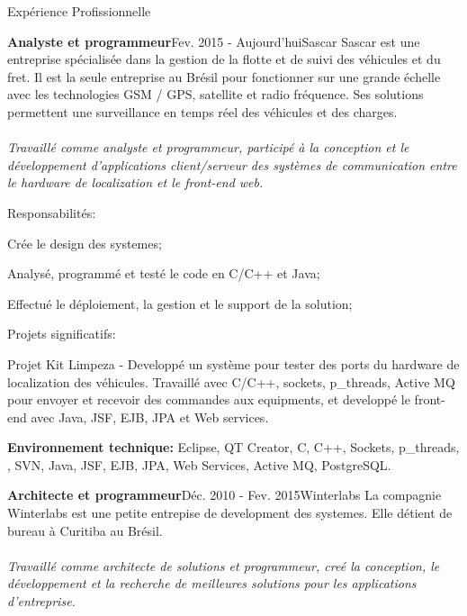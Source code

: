 \documentclass{resume}
\begin{document}
  \begin{rSection}{Expérience Profissionnelle}

    \begin{rSubsection}{\fontsize{12}{14}\selectfont \bf Analyste et programmeur}{\fontsize{12}{14}\selectfont Fev. 2015 - Aujourd'hui}{\fontsize{12}{14}\selectfont Sascar}{}
    Sascar est une entreprise spécialisée dans la gestion de la flotte et de suivi des véhicules et du fret. Il est la seule entreprise au Brésil pour fonctionner sur une grande échelle avec les technologies GSM / GPS, satellite et radio fréquence. Ses solutions permettent une surveillance en temps réel des véhicules et des charges.\\\\
    \textit{Travaillé comme analyste et programmeur, participé à la conception et le développement d’applications client/serveur des systèmes de communication entre le hardware de localization et le front-end web.}

    \end{rSubsection}

      \begin{rSubsection}{\fontsize{9}{10}\selectfont Responsabilités:}{}{}{}
        \item Crée le design des systemes;
        \item Analysé, programmé et testé le code en C/C++ et Java;
        \item Effectué le déploiement, la gestion et le support de la solution;
      \end{rSubsection}

      \begin{rSubsection}{\fontsize{9}{10}\selectfont Projets significatifs:}{}{}{}
        \item Projet Kit Limpeza - Developpé un système pour tester des ports du hardware de localization des véhicules. Travaillé avec C/C++, sockets, p\_threads, Active MQ pour envoyer et recevoir des commandes aux equipments, et developpé le front-end avec Java, JSF, EJB, JPA et Web services.
      \end{rSubsection}

      {\fontsize{8}{9}\selectfont \textbf{Environnement technique:} Eclipse, QT Creator, C, C++, Sockets, p\_threads, , SVN, Java, JSF, EJB, JPA, Web Services, Active MQ, PostgreSQL.}\\

    \begin{rSubsection}{\fontsize{12}{14}\selectfont \bf Architecte et programmeur}{\fontsize{12}{14}\selectfont Déc. 2010 - Fev. 2015}{\fontsize{12}{14}\selectfont Winterlabs}{}
    La compagnie Winterlabs est une petite entrepise de development des systemes. Elle
détient de bureau à Curitiba au Brésil. \\\\
\textit{Travaillé comme architecte de solutions et programmeur, creé la conception, le développement et la recherche de meilleures solutions pour les applications d'entreprise.}
    \end{rSubsection}


\end{rSection}
\end{document}
